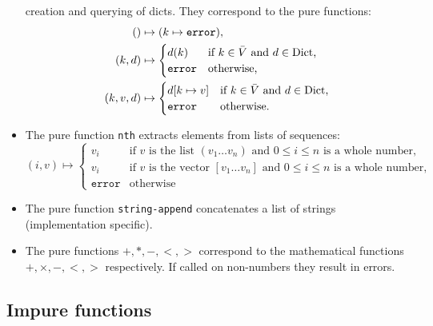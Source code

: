 \begin{itemize}
  creation and querying of dicts. They correspond to the pure functions:
  \begin{align*}
    () &\mapsto (k \mapsto \mathtt{error}),\\
    (k, d) &\mapsto
             \begin{cases}
               d(k) & \text{if $k \in \bar V$ and $d \in \mathrm{Dict}$,}\\
               \mathtt{error} & \text{otherwise,}
             \end{cases}\\
    (k, v, d) &\mapsto \begin{cases}
                       d[k \mapsto v] & \text{if $k \in \bar V$ and $d \in \mathrm{Dict}$,}\\
                       \mathtt{error} & \text{otherwise.}
                       \end{cases}
  \end{align*}
\item The pure function \texttt{nth} extracts elements from lists of sequences:
  \[
    (i, v) \mapsto
    \begin{cases}
      v_i & \text{if $v$ is the list $(v_1 \ldots v_n)$ and $0 \leq i \leq n$ is
        a whole number,}\\
      v_i & \text{if $v$ is the vector $[v_1 \ldots v_n]$ and $0 \leq i \leq n$ is
      a whole number,}\\
      \mathtt{error} & \text{otherwise}
    \end{cases}
  \]
\item The pure function \texttt{string-append} concatenates a list of strings
  (implementation specific).
\item The pure functions $\mathtt{+}, \mathtt{*}, \mathtt{-}, \mathtt{<},
  \mathtt{>}$ correspond to the mathematical functions $+, \times, -, <, >$
  respectively. If called on non-numbers they result in errors.
\end{itemize}

\subsection{Impure functions}

